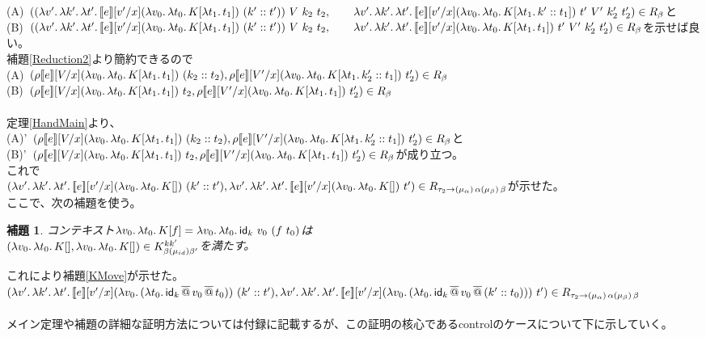 \documentclass[japanese,draft]{jssst_ppl} %
\newtheorem{lemma}[definition]{補題}
\begin{document}
(A)\ $(\LamP{v'}{\Lam{k'}{\Lam{t'}{\CPSTh{e}[\Change{x}{v'}] \LamP{v_0}{\Lam{t_0}{K[\Lam{t_1}{t_1}]}}\ \ConsP{k'}{t'}}}}\ V\ k_2\ t_2,\\
\qquad \Lam{v'}{\Lam{k'}{\Lam{t'}{\CPSTh{e}[\Change{x}{v'}] \LamP{v_0}{\Lam{t_0}{K[\Lam{t_1}{\Cons{k'}{t_1}}]}}\ t'}}}\ V'\ k_2'\ t_2')\in R_{\beta}$と\\
(B)\ $(\LamP{v'}{\Lam{k'}{\Lam{t'}{\CPSTh{e}[\Change{x}{v'}] \LamP{v_0}{\Lam{t_0}{K[\Lam{t_1}{t_1}]}}\ \ConsP{k'}{t'}}}}\ V\ k_2\ t_2,\\
\qquad \Lam{v'}{\Lam{k'}{\Lam{t'}{\CPSTh{e}[\Change{x}{v'}] \LamP{v_0}{\Lam{t_0}{K[\Lam{t_1}{t_1}]}}\ t'}}}\ V'\ k_2'\ t_2')\in R_{\beta}$を示せば良い。\\
補題\ref{Reduction2}より簡約できるので\\
(A)\ $(\rho \CPSTh{e}[\Change{x}{V}] \LamP{v_0}{\Lam{t_0}{K[\Lam{t_1}{t_1}]}}\ \ConsP{k_2}{t_2},
 \rho \CPSTh{e}[\Change{x}{V'}] \LamP{v_0}{\Lam{t_0}{K[\Lam{t_1}{\Cons{k_2'}{t_1}}]}}\ t_2')\in R_{\beta}$\\
(B)\ $(\rho \CPSTh{e}[\Change{x}{V}] \LamP{v_0}{\Lam{t_0}{K[\Lam{t_1}{t_1}]}}\ t_2,
 \rho \CPSTh{e}[\Change{x}{V'}] \LamP{v_0}{\Lam{t_0}{K[\Lam{t_1}{t_1}]}}\ t_2')\in R_{\beta}$\\
\\
定理\ref{HandMain}より、\\
(A)'\ $(\rho \CPSTh{e}[\Change{x}{V}] \LamP{v_0}{\Lam{t_0}{K[\Lam{t_1}{t_1}]}}\ \ConsP{k_2}{t_2}, \rho \CPSTh{e}[\Change{x}{V'}] \LamP{v_0}{\Lam{t_0}{K[\Lam{t_1}{\Cons{k_2'}{t_1}}]}}\ t_2')\in R_{\beta}$と\\
(B)'\  $(\rho \CPSTh{e}[\Change{x}{V}] \LamP{v_0}{\Lam{t_0}{K[\Lam{t_1}{t_1}]}}\ t_2, \rho \CPSTh{e}[\Change{x}{V'}] \LamP{v_0}{\Lam{t_0}{K[\Lam{t_1}{t_1}]}}\ t_2')\in R_{\beta}$が成り立つ。\\
これで\\
$(\Lam{v'}{\Lam{k'}{\Lam{t'}{\CPSTh{e}[\Change{x}{v'}] \LamP{v_0}{\Lam{t_0}{K[]}}\ \ConsP{k'}{t'}}}},\\
\Lam{v'}{\Lam{k'}{\Lam{t'}{\CPSTh{e}[\Change{x}{v'}] \LamP{v_0}{\Lam{t_0}{K[]}}\ t'}}})
\in R_{\tau_2 \rightarrow \TrailType{\alpha} \TrailType{\beta}}$が示せた。
\\
ここで、次の補題を使う。
\begin{lemma}
  コンテキスト$\Lam{v_0}{\Lam{t_0}{K[f]}}=\Lam{v_0}{\Lam{t_0}{\Idk\ v_0\ (f\ t_0)}}$は\\
  $(\Lam{v_0}{\Lam{t_0}{K[]}}, \Lam{v_0}{\Lam{t_0}{K[]}})\in  K^{kk'}_{\beta(\mu_{id})\beta'}$を満たす。
\label{IdkContext}
\end{lemma}
これにより補題\ref{KMove}が示せた。\\
$(\Lam{v'}{\Lam{k'}{\Lam{t'}{\CPSTh{e}[\Change{x}{v'}] \LamP{v_0}{\LamP{t_0}{\SApp{\Idk}{\SApp{v_0}{t_0}}}}\ \ConsP{k'}{t'}}}},\\
\Lam{v'}{\Lam{k'}{\Lam{t'}{\CPSTh{e}[\Change{x}{v'}] \LamP{v_0}{\LamP{t_0}{\SApp{\Idk}{\SApp{v_0}{\ConsP{k'}{t_0}}}}}\ t'}}})
\in R_{\tau_2 \rightarrow \TrailType{\alpha} \TrailType{\beta}}$\\
\\
メイン定理や補題の詳細な証明方法については付録に記載するが、この証明の核心であるcontrolのケースについて下に示していく。
\end{document}
